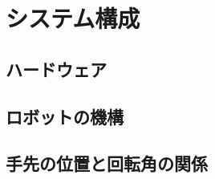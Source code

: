 \chapter{システム構成}
  \label{chap:system}
  \section{ハードウェア}
  	\label{chap:hardware}
  
  \section{ロボットの機構}
  	\label{chap:mechanism}
  
  \section{手先の位置と回転角の関係}
  	\label{chap:kinetic}
